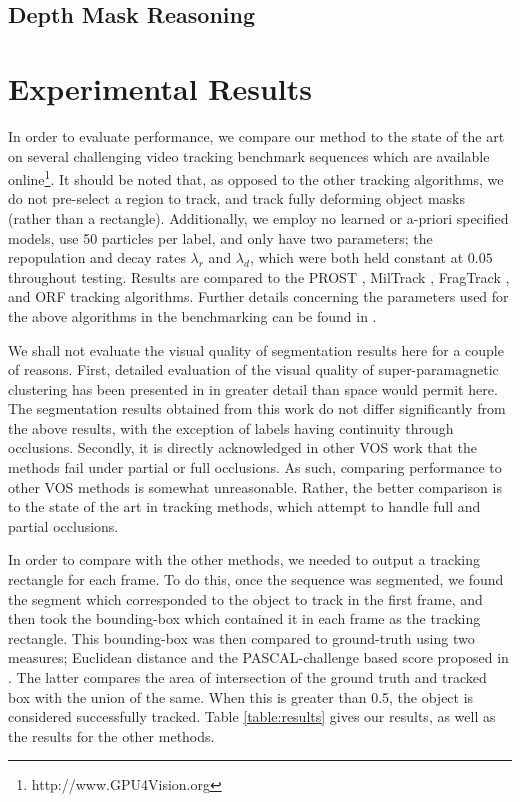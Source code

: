 \subsection{Depth Mask Reasoning}

\section{Experimental Results}
\label{sec:Experimental Results}

In order to evaluate performance, we compare our method to the state of the art on several challenging video tracking benchmark sequences which are available online\footnote{http://www.GPU4Vision.org}. It should be noted that, as opposed to the other tracking algorithms, we do not pre-select a region to track, and track fully deforming object masks (rather than a rectangle). Additionally, we employ no learned or a-priori specified models, use 50 particles per label, and only have two parameters; the repopulation and decay rates $\lambda_r$ and $\lambda_d$, which were both held constant at $0.05$ throughout testing. Results are compared to the PROST \cite{PROST}, MilTrack \cite{MilTrack}, FragTrack \cite{FragTrack}, and ORF \cite{ORF} tracking algorithms. Further details concerning the parameters used for the above algorithms in the benchmarking can be found in \cite{PROST}.


We shall not evaluate the visual quality of segmentation results here for a couple of reasons. First, detailed evaluation of the visual quality of super-paramagnetic clustering has been presented in \cite{Abramov_RealtimeSegmentation} in greater detail than space would permit here. The segmentation results obtained from this work do not differ significantly from the above results, with the exception of labels having continuity through occlusions. Secondly, it is directly acknowledged in other VOS work that the methods fail under partial \cite{MSVS,PropValAgg} or full \cite{SegTrackRegions,MHVS} occlusions. As such, comparing performance to other VOS methods is somewhat unreasonable. Rather, the better comparison is to the state of the art in tracking methods, which attempt to handle full and partial occlusions.


In order to compare with the other methods, we needed to output a tracking rectangle for each frame. To do this, once the sequence was segmented, we found the segment which corresponded to the object to track in the first frame, and then took the bounding-box which contained it in each frame as the tracking rectangle. This bounding-box was then compared to ground-truth using two measures; Euclidean distance and the PASCAL-challenge based score proposed in \cite{PROST}. The latter compares the area of intersection of the ground truth and tracked box with the union of the same. When this is greater than 0.5, the object is considered successfully tracked. Table \ref{table:results} gives our results, as well as the results for the other methods.
 
